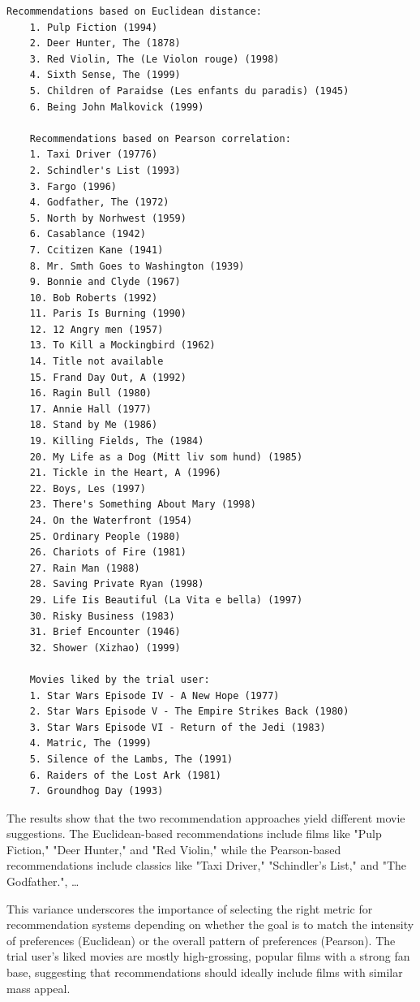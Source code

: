\begin{lstlisting}[style=StyleResult]
	Recommendations based on Euclidean distance:
	1. Pulp Fiction (1994)
	2. Deer Hunter, The (1878)
	3. Red Violin, The (Le Violon rouge) (1998)
	4. Sixth Sense, The (1999)
	5. Children of Paraidse (Les enfants du paradis) (1945)
	6. Being John Malkovick (1999)
	
	Recommendations based on Pearson correlation:
	1. Taxi Driver (19776)
	2. Schindler's List (1993)
	3. Fargo (1996)
	4. Godfather, The (1972)
	5. North by Norhwest (1959)
	6. Casablance (1942)
	7. Ccitizen Kane (1941)
	8. Mr. Smth Goes to Washington (1939)
	9. Bonnie and Clyde (1967)
	10. Bob Roberts (1992)
	11. Paris Is Burning (1990)
	12. 12 Angry men (1957)
	13. To Kill a Mockingbird (1962)
	14. Title not available
	15. Frand Day Out, A (1992)
	16. Ragin Bull (1980)
	17. Annie Hall (1977)
	18. Stand by Me (1986)
	19. Killing Fields, The (1984)
	20. My Life as a Dog (Mitt liv som hund) (1985)
	21. Tickle in the Heart, A (1996)
	22. Boys, Les (1997)
	23. There's Something About Mary (1998)
	24. On the Waterfront (1954)
	25. Ordinary People (1980)
	26. Chariots of Fire (1981)
	27. Rain Man (1988)
	28. Saving Private Ryan (1998)
	29. Life Iis Beautiful (La Vita e bella) (1997)
	30. Risky Business (1983)
	31. Brief Encounter (1946)
	32. Shower (Xizhao) (1999)
	
	Movies liked by the trial user:
	1. Star Wars Episode IV - A New Hope (1977)
	2. Star Wars Episode V - The Empire Strikes Back (1980)
	3. Star Wars Episode VI - Return of the Jedi (1983)
	4. Matric, The (1999)
	5. Silence of the Lambs, The (1991)
	6. Raiders of the Lost Ark (1981)
	7. Groundhog Day (1993)
\end{lstlisting}

The results show that the two recommendation approaches yield different movie suggestions. The Euclidean-based recommendations include films like "Pulp Fiction," "Deer Hunter," and "Red Violin," while the Pearson-based recommendations include classics like "Taxi Driver," "Schindler's List," and "The Godfather.", \dots

This variance underscores the importance of selecting the right metric for recommendation systems depending on whether the goal is to match the intensity of preferences (Euclidean) or the overall pattern of preferences (Pearson). The trial user’s liked movies are mostly high-grossing, popular films with a strong fan base, suggesting that recommendations should ideally include films with similar mass appeal.

